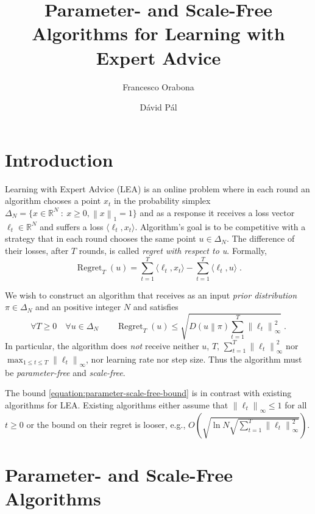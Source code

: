 \documentclass{article}
\newcommand{\R}{\mathbb{R}}
\newcommand{\norm}[1]{\left\|#1\right\|}
\newcommand{\KL}[2]{D\left(#1 \middle\| #2 \right)}
\DeclareMathOperator{\Regret}{Regret}
\begin{document}
\title{Parameter- and Scale-Free Algorithms for Learning with Expert Advice}
\author{Francesco Orabona \and D\'avid P\'al}
\maketitle

\section{Introduction}

Learning with Expert Advice (LEA) is an online problem where in each round an
algorithm chooses a point $x_t$ in the probability simplex $\Delta_N = \{x \in
\R^N ~:~ x \ge 0, \norm{x}_1 = 1 \}$ and as a response it receives a loss
vector $\ell_t \in \R^N$ and suffers a loss $\langle \ell_t, x_t \rangle$.
Algorithm's goal is to be competitive with a strategy that in each round
chooses the same point $u \in \Delta_N$.
The difference of their losses, after $T$ rounds, is called
\emph{regret with respect to u}. Formally,
$$
\Regret_T(u) = \sum_{t=1}^T \langle \ell_t, x_t \rangle - \sum_{t=1}^T \langle \ell_t, u \rangle \; .
$$

We wish to construct an algorithm that receives as an input \emph{prior
distribution} $\pi \in \Delta_N$ and an positive integer $N$ and satisfies
\begin{equation}
\label{equation:parameter-scale-free-bound}
\forall T \ge 0 \quad \forall u \in \Delta_N \qquad \Regret_T(u) \le \sqrt{\KL{u}{\pi} \sum_{t=1}^T \norm{\ell_t}_\infty^2} \; .
\end{equation}
In particular, the algorithm does \emph{not} receive neither $u$, $T$,
$\sum_{t=1}^T \norm{\ell_t}_\infty^2$ nor $\max_{1 \le t \le T}
\norm{\ell_t}_\infty$, nor learning rate nor step size.
Thus the algorithm must be \emph{parameter-free} and \emph{scale-free}.

The bound \eqref{equation:parameter-scale-free-bound} is in contrast with existing
algorithms for LEA. Existing algorithms either assume that $\norm{\ell_t}_\infty \le 1$
for all $t \ge 0$ or the bound on their regret is looser, e.g., $O\left( \sqrt{\ln N \sqrt{\sum_{t=1}^T \norm{\ell_t}_\infty^2}} \right)$.

\section{Parameter- and Scale-Free Algorithms}
\end{document}
